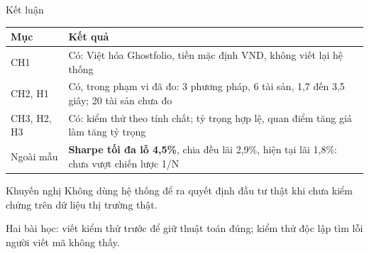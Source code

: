 \documentclass[aspectratio=169,10pt]{beamer}
\let\small\normalsize
\begin{document}
\begin{frame}[t]{Kết luận}
  \centering\small
  \begin{tabular}{@{}L{2.2cm}L{10.6cm}@{}}
    \toprule
    \textbf{Mục} & \textbf{Kết quả} \\
    \midrule
    CH1 & Có: Việt hóa Ghostfolio, tiền mặc định VND, không viết lại hệ thống \\
    CH2, H1 & Có, trong phạm vi đã đo: 3 phương pháp, 6 tài sản, 1,7 đến 3,5 giây; 20 tài sản chưa đo \\
    CH3, H2, H3 & Có: kiểm thử theo tính chất; tỷ trọng hợp lệ, quan điểm tăng giá làm tăng tỷ trọng \\
    Ngoài mẫu & \textbf{Sharpe tối đa lỗ 4,5\%}, chia đều lãi 2,9\%, hiện tại lãi 1,8\%: chưa vượt chiến lược 1/N \\
    \bottomrule
  \end{tabular}

  \vspace{6pt}
  \begin{block}{Khuyến nghị}
    \small Không dùng hệ thống để ra quyết định đầu tư thật khi chưa kiểm chứng trên dữ liệu thị trường thật.
  \end{block}
  \vspace{-2pt}
  {\small Hai bài học: viết kiểm thử trước để giữ thuật toán đúng; kiểm thử độc lập tìm lỗi người viết mã không thấy.}
\end{frame}
\end{document}
